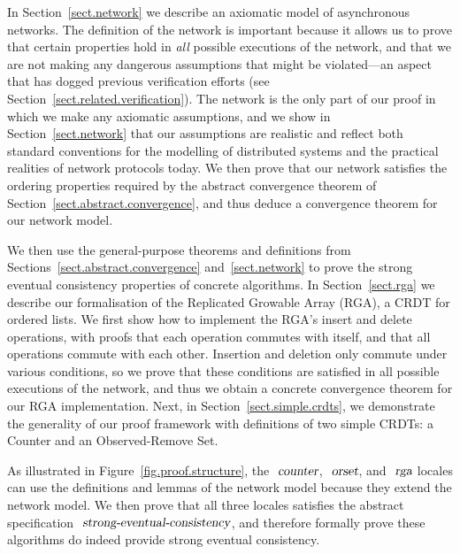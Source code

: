 In Section~\ref{sect.network} we describe an axiomatic model of asynchronous networks.
The definition of the network is important because it allows us to prove that certain properties hold in \emph{all} possible executions of the network, and that we are not making any dangerous assumptions that might be violated---an aspect that has dogged previous verification efforts (see Section~\ref{sect.related.verification}).
The network is the only part of our proof in which we make any axiomatic assumptions, and we show in Section~\ref{sect.network} that our assumptions are realistic and reflect both standard conventions for the modelling of distributed systems and the practical realities of network protocols today.
We then prove that our network satisfies the ordering properties required by the abstract convergence theorem of Section~\ref{sect.abstract.convergence}, and thus deduce a convergence theorem for our network model.

We then use the general-purpose theorems and definitions from Sections~\ref{sect.abstract.convergence} and~\ref{sect.network} to prove the strong eventual consistency properties of concrete algorithms.
In Section~\ref{sect.rga} we describe our formalisation of the Replicated Growable Array (RGA), a CRDT for ordered lists.
We first show how to implement the RGA's insert and delete operations, with proofs that each operation commutes with itself, and that all operations commute with each other.
Insertion and deletion only commute under various conditions, so we prove that these conditions are satisfied in all possible executions of the network, and thus we obtain a concrete convergence theorem for our RGA implementation.
Next, in Section~\ref{sect.simple.crdts}, we demonstrate the generality of our proof framework with definitions of two simple CRDTs: a Counter and an Observed-Remove Set.

As illustrated in Figure~\ref{fig.proof.structure}, the $\isa{counter}$, $\isa{orset}$, and $\isa{rga}$ locales can use the definitions and lemmas of the network model because they extend the network model. We then prove that all three locales satisfies the abstract specification $\isa{strong-eventual-consistency}$, and therefore formally prove these algorithms do indeed provide strong eventual consistency.

